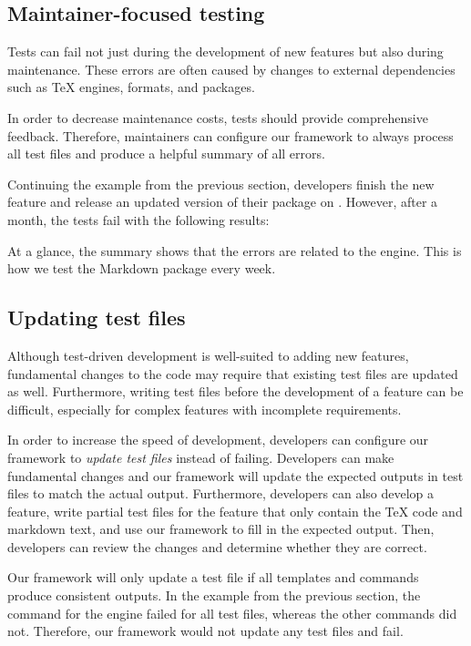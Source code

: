 \documentclass[final]{ltugboat}
\begin{document}
\subsection{Maintainer-focused testing}

Tests can fail not just during the development of new features but also during maintenance. These errors are often caused by changes to external dependencies such as \TeX{} engines, formats, and packages.

In order to decrease maintenance costs, tests should provide comprehensive feedback. Therefore, maintainers can configure our framework to always process all test files and produce a helpful summary of all errors.

Continuing the example from the previous section, developers finish the new feature and release an updated version of their package on . However, after a month, the tests fail with the following results:

\medskip
\noindent
\begingroup
\centering

\par
\endgroup

\medskip
\noindent
At a glance, the summary shows that the errors are related to the  engine. This is how we test the Markdown package every week.

\subsection{Updating test files}
\label{sec:updating-test-files}

Although test-driven development is well-suited to adding new features, fundamental changes to the code may require that existing test files are updated as well. Furthermore, writing test files before the development of a feature can be difficult, especially for complex features with incomplete requirements.

In order to increase the speed of development, developers can configure our framework to \emph{update test files} instead of failing. Developers can make fundamental changes and our framework will update the expected outputs in test files to match the actual output. Furthermore, developers can also develop a feature, write partial test files for the feature that only contain the \TeX{} code and markdown text, and use our framework to fill in the expected output. Then, developers can review the changes and determine whether they are correct.

Our framework will only update a test file if all templates and commands produce consistent outputs. In the example from the previous section, the command for the  engine failed for all test files, whereas the other commands did not. Therefore, our framework would not update any test files and fail.
\end{document}
